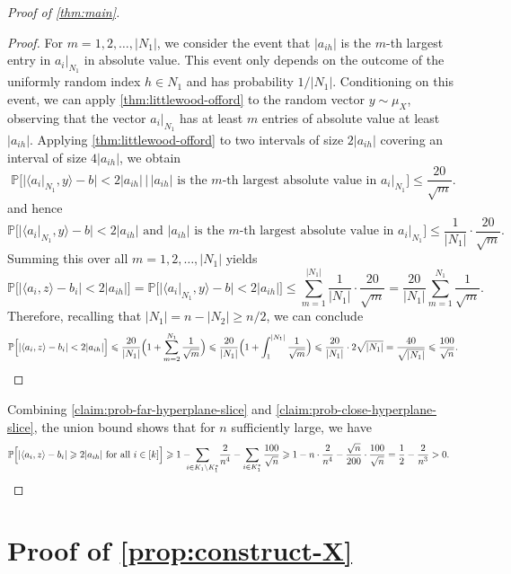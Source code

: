 \documentclass[reqno]{amsart}
\theoremstyle{remark}
\theoremstyle{definition}
\numberwithin{theorem}{section}
\renewcommand{\(}{\bigl(}
\renewcommand{\)}{\bigr)\vphantom{)}}
\renewcommand{\le}{\leqslant}
\renewcommand{\ge}{\geqslant}
\renewcommand{\P}{\mathbb{P}}
\newcommand{\ang}[1]{\langle#1\rangle}
\begin{document}
\begin{proof}[Proof of \cref{thm:main}]
\begin{proof}
For $m=1,2,\dots,|N_1|$, we consider the event that $|a_{ih}|$ is the $m$-th largest entry in $a_i|_{N_1}$ in absolute value. This event  only depends on the outcome of the uniformly  random index $h\in N_1$ and has probability $1/|N_1|$. Conditioning on this event, we can apply \cref{thm:littlewood-offord} to the random vector $y\sim \mu_X$, observing that the vector $a_i|_{N_1}$ has at least $m$ entries of absolute value at least $|a_{ih}|$. Applying \cref{thm:littlewood-offord} to two intervals of size $2|a_{ih}|$ covering an interval of size $4|a_{ih}|$, we obtain
    \[\P\Big[|\ang{a_i|_{N_1}, y} - b| < 2|a_{ih}| \,\Big|\, \text{$|a_{ih}|$ is the $m$-th largest absolute value in $a_i|_{N_1}$}\Big] \le \frac{20}{\sqrt{m}}.\]
and hence
\[\P\Big[|\ang{a_i|_{N_1}, y} - b| < 2|a_{ih}| \text{ and $|a_{ih}|$ is the $m$-th largest absolute value in $a_i|_{N_1}$}\Big] \le \frac{1}{|N_1|} \cdot \frac{20}{\sqrt{m}}.\]
Summing this over all $m=1,2,\dots,|N_1|$ yields
\[\P\Big[|\ang{a_i,z} - b_i|< 2|a_{ih}|\Big]=\P\Big[|\ang{a_i|_{N_1}, y} - b| < 2|a_{ih}|\Big]\le \sum_{m=1}^{|N_1|} \frac{1}{|N_1|} \cdot \frac{20}{\sqrt{m}}=\frac{20}{|N_1|}\sum_{m = 1}^{N_1}\frac{1}{\sqrt{m}}.
        \]
Therefore, recalling that $|N_1|=n-|N_2|\ge n/2$, we can conclude
\[
       \P\Big[|\ang{a_i,z} - b_i|< 2|a_{ih}|\Big]
        \le \frac{20}{|N_1|}\Big(1+\sum_{m = 2}^{N_1}\frac{1}{\sqrt{m}}\Big)\le \frac{20}{|N_1|} \Big(1+\int_1^{|N_1|}\frac{1}{\sqrt{m}}\Big) \le \frac{20}{|N_1|}\cdot 2\sqrt{|N_1|}= \frac{40}{\sqrt{|N_1|}} \le \frac{100}{\sqrt{n}}.\qedhere
\]
\end{proof}

Combining \cref{claim:prob-far-hyperplane-slice} and \cref{claim:prob-close-hyperplane-slice}, the union bound shows that for $n$ sufficiently large, we have
\begin{align*}
    \P\Big[|\ang{a_i,z} - b_i|\ge 2|a_{ih}| \text{ for all } i\in [k]\Big]&\ge 1-\!\!\!\!\sum_{i\in K_1\setminus K_1^*}\!\frac{2}{n^4} - \sum_{i\in K_1^*}\frac{100}{\sqrt{n}}
    \ge 1-n\cdot \frac{2}{n^4} - \frac{\sqrt{n}}{200}\cdot \frac{100}{\sqrt{n}} =\frac{1}{2}-\frac{2}{n^3} >0. \qedhere
\end{align*}
\end{proof}




\section{Proof of \cref{prop:construct-X}}\label{sec:prop-proof}
\end{document}

